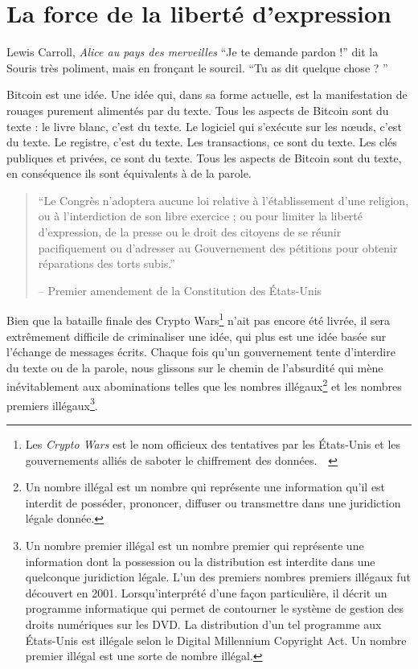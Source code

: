 \chapter{La force de la liberté d'expression}
\label{les:6}

\begin{chapquote}{Lewis Carroll, \textit{Alice au pays des merveilles}}
\enquote{Je te demande pardon !} dit la Souris très poliment, mais en fronçant
le sourcil. \enquote{Tu as dit quelque chose ? }
\end{chapquote}

Bitcoin est une idée. Une idée qui, dans sa forme actuelle, est la manifestation
de rouages purement alimentés par du texte. Tous les aspects de Bitcoin sont du
texte : le livre blanc, c'est du texte. Le logiciel qui s'exécute sur les nœuds,
c'est du texte. Le registre, c'est du texte. Les transactions, ce sont du texte.
Les clés publiques et privées, ce sont du texte. Tous les aspects de Bitcoin
sont du texte, en conséquence ils sont équivalents à de la parole.

\begin{quotation}\begin{samepage}
\enquote{Le Congrès n'adoptera aucune loi relative à l'établissement d'une
religion, ou à l'interdiction de son libre exercice ; ou pour limiter la liberté
d'expression, de la presse ou le droit des citoyens de se réunir pacifiquement
ou d'adresser au Gouvernement des pétitions pour obtenir réparations des torts
subis.}
\begin{flushright} -- Premier amendement de la Constitution des États-Unis
\end{flushright}\end{samepage}\end{quotation}

Bien que la bataille finale des Crypto Wars\footnote{Les \textit{Crypto Wars}
est le nom officieux des tentatives par les États-Unis et les gouvernements
alliés de saboter le chiffrement des
données.~\cite{eff-cryptowars}~\cite{wiki:cryptowars}} n'ait pas encore été
livrée, il sera extrêmement difficile de criminaliser une idée, qui plus est une
idée basée sur l'échange de messages écrits. Chaque fois qu'un gouvernement
tente d'interdire du texte ou de la parole, nous glissons sur le chemin de
l'absurdité qui mène inévitablement aux abominations telles que les nombres
illégaux\footnote{Un nombre illégal est un nombre qui représente une information
qu'il est interdit de posséder, prononcer, diffuser ou transmettre dans une
juridiction légale donnée.\cite{wiki:illegal-number}} et les nombres premiers
illégaux\footnote{Un nombre premier illégal est un nombre premier qui représente
une information dont la possession ou la distribution est interdite dans une
quelconque juridiction légale. L'un des premiers nombres premiers illégaux fut
découvert en 2001. Lorsqu'interprété d'une façon particulière, il décrit un
programme informatique qui permet de contourner le système de gestion des
droits numériques sur les DVD. La distribution d'un tel programme aux États-Unis
est illégale selon le Digital Millennium Copyright Act. Un nombre premier
illégal est une sorte de nombre illégal.\cite{wiki:illegal-prime}}.

